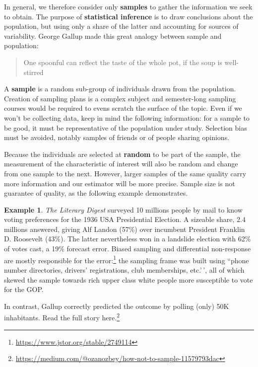 \documentclass[
  11pt,
  letterpaper,
]{book}
\renewcommand{\href}[2]{#2\footnote{\url{#1}}}
\theoremstyle{definition}
\theoremstyle{definition}
\newtheorem{example}{Example}[chapter]
\theoremstyle{definition}
\theoremstyle{remark}
\begin{document}
In general, we therefore consider only \textbf{samples} to gather the information we seek to obtain. The purpose of \textbf{statistical inference} is to draw conclusions about the population, but using only a share of the latter and accounting for sources of variability. George Gallup made this great analogy between sample and population:

\begin{quote}
One spoonful can reflect the taste of the whole pot, if the soup is well-stirred
\end{quote}

A \textbf{sample} is a random sub-group of individuals drawn from the population. Creation of sampling plans is a complex subject and semester-long sampling courses would be required to evens scratch the surface of the topic. Even if we won't be collecting data, keep in mind the following information: for a sample to be good, it must be representative of the population under study. Selection bias must be avoided, notably samples of friends or of people sharing opinions.

Because the individuals are selected at \textbf{random} to be part of the sample, the measurement of the characteristic of interest will also be random and change from one sample to the next. However, larger samples of the same quality carry more information and our estimator will be more precise. Sample size is not guarantee of quality, as the following example demonstrates.

\begin{example}
\protect\hypertarget{exm:Galluppoll}{}{\label{exm:Galluppoll} }
\emph{The Literary Digest} surveyed 10 millions people by mail to know voting preferences for the 1936 USA Presidential Election. A sizeable share, 2.4 millions answered, giving Alf Landon (57\%) over incumbent President Franklin D. Roosevelt (43\%). The latter nevertheless won in a landslide election with 62\% of votes cast, a 19\% forecast error. \href{https://www.jstor.org/stable/2749114}{Biased sampling and differential non-response are mostly responsible for the error:} the sampling frame was built using ``phone number directories, drivers' registrations, club memberships, etc.'\,', all of which skewed the sample towards rich upper class white people more susceptible to vote for the GOP.

In contrast, Gallup correctly predicted the outcome by polling (only) 50K inhabitants. \href{https://medium.com/@ozanozbey/how-not-to-sample-11579793dac}{Read the full story here.}
\end{example}
\end{document}
